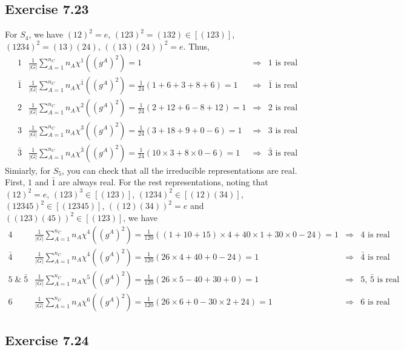 \documentclass[]{ctexart}
\begin{document}
\subsection{Exercise 7.23}
For $S_4$, we have $(12)^2=e$, $(123)^2=(132)\in[(123)]$, $(1234)^2=(13)(24)$, $((13)(24))^2=e$. Thus, 
\begin{equation*}
\begin{array}{l|lcl}
1 & \frac{1}{|G|}\sum_{A=1}^{n_C}n_A\chi^1((g^A)^2)=1 & \Rightarrow & \text{1 is real}\\
\bar 1 & \frac{1}{|G|}\sum_{A=1}^{n_C}n_A\chi^{\bar 1}((g^A)^2)=\frac{1}{24}(1+6+3+8+6)=1 & \Rightarrow & \text{$\bar 1$ is real}\\
2 & \frac{1}{|G|}\sum_{A=1}^{n_C}n_A\chi^2((g^A)^2)=\frac{1}{24}(2+12+6-8+12)=1 & \Rightarrow & \text{2 is real}\\
3 & \frac{1}{|G|}\sum_{A=1}^{n_C}n_A\chi^3((g^A)^2)=\frac{1}{24}(3+18+9+0-6)=1 & \Rightarrow & \text{3 is real}\\
\bar 3 & \frac{1}{|G|}\sum_{A=1}^{n_C}n_A\chi^{\bar 3}((g^A)^2)=\frac{1}{24}(10\times 3+8\times 0-6)=1 & \Rightarrow & \text{$\bar 3$ is real}
\end{array}
\end{equation*}
Simiarly, for $S_5$, you can check that all the irreducible representations are real. First, $1$ and $\bar 1$ are always real. 
For the rest representations, noting that $(12)^2=e$, $(123)^3\in[(123)]$, $(1234)^2\in[(12)(34)]$, $(12345)^2\in[(12345)]$, $((12)(34))^2=e$ and $((123)(45))^2\in[(123)]$, we have 
\begin{equation*}
\begin{array}{l|lcl}
4 & \frac{1}{|G|}\sum_{A=1}^{n_C}n_A\chi^4((g^A)^2)=\frac{1}{120}((1+10+15)\times 4+40\times 1+30\times 0-24)=1 & \Rightarrow & \text{4 is real}\\
\bar 4 & \frac{1}{|G|}\sum_{A=1}^{n_C}n_A\chi^{\bar 4}((g^A)^2)=\frac{1}{120}(26\times 4+40+0-24)=1 & \Rightarrow & \text{$\bar 4$ is real}\\
5\;\&\;\bar 5 & \frac{1}{|G|}\sum_{A=1}^{n_C}n_A\chi^5((g^A)^2)=\frac{1}{120}(26\times 5-40+30+0)=1 & \Rightarrow & \text{5, $\bar 5$ is real}\\
6 & \frac{1}{|G|}\sum_{A=1}^{n_C}n_A\chi^6((g^A)^2)=\frac{1}{120}(26\times 6+0-30\times 2+24)=1 & \Rightarrow & \text{6 is real}
\end{array}
\end{equation*}
\subsection{Exercise 7.24}
\end{document}
